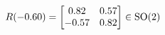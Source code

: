 \documentclass[preview]{standalone}
\begin{document}
\begin{align*}
\special{dvisvgm:raw <g id='unique000'>}R(-0.60) = \begin{bmatrix} 0.82 & 0.57 \\ -0.57 & 0.82 \end{bmatrix} \in \text{SO}(2)\special{dvisvgm:raw </g>}
\end{align*}
\end{document}
